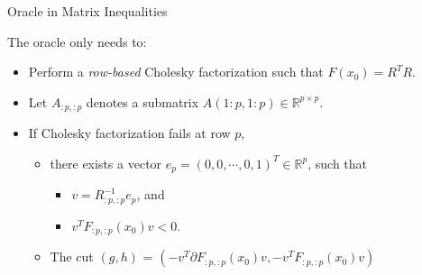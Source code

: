 \documentclass[10pt,ignorenonframetext,serif,onlymath]{beamer}
\providecommand{\tightlist}{%
  \setlength{\itemsep}{0pt}\setlength{\parskip}{0pt}}
\begin{document}
\begin{frame}{Oracle in Matrix Inequalities}
\protect\hypertarget{sec:oracle-in-matrix-inequalities}{}

The oracle only needs to:

\begin{itemize}
\tightlist
\item
  Perform a \emph{row-based} Cholesky factorization such that
  \(F(x_0) = R^T R\).
\item
  Let \(A_{:p,:p}\) denotes a submatrix
  \(A(1:p, 1:p) \in \mathbb{R}^{p\times p}\).
\item
  If Cholesky factorization fails at row \(p\),

  \begin{itemize}
  \tightlist
  \item
    there exists a vector
    \(e_p = (0, 0, \cdots, 0, 1)^T \in \mathbb{R}^p\), such that

    \begin{itemize}
    \tightlist
    \item
      \(v = R_{:p,:p}^{-1} e_p\), and
    \item
      \(v^T F_{:p,:p}(x_0) v < 0\).
    \end{itemize}
  \item
    The cut \((g, h)\) =
    \((-v^T \partial F_{:p,:p}(x_0) v, -v^T F_{:p,:p}(x_0) v)\)
  \end{itemize}
\end{itemize}

\end{frame}
\end{document}
